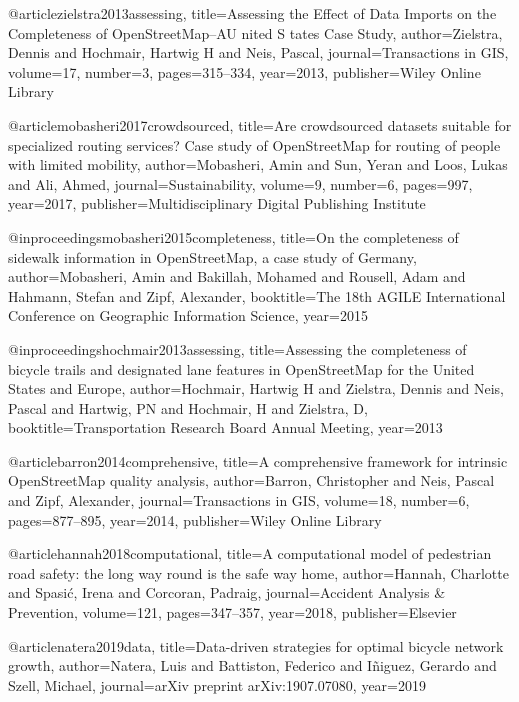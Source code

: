 @article{zielstra2013assessing,
  title={Assessing the Effect of Data Imports on the Completeness of OpenStreetMap--AU nited S tates Case Study},
  author={Zielstra, Dennis and Hochmair, Hartwig H and Neis, Pascal},
  journal={Transactions in GIS},
  volume={17},
  number={3},
  pages={315--334},
  year={2013},
  publisher={Wiley Online Library}
}


@article{mobasheri2017crowdsourced,
  title={Are crowdsourced datasets suitable for specialized routing services? Case study of OpenStreetMap for routing of people with limited mobility},
  author={Mobasheri, Amin and Sun, Yeran and Loos, Lukas and Ali, Ahmed},
  journal={Sustainability},
  volume={9},
  number={6},
  pages={997},
  year={2017},
  publisher={Multidisciplinary Digital Publishing Institute}
}

@inproceedings{mobasheri2015completeness,
  title={On the completeness of sidewalk information in OpenStreetMap, a case study of Germany},
  author={Mobasheri, Amin and Bakillah, Mohamed and Rousell, Adam and Hahmann, Stefan and Zipf, Alexander},
  booktitle={The 18th AGILE International Conference on Geographic Information Science},
  year={2015}
}

@inproceedings{hochmair2013assessing,
  title={Assessing the completeness of bicycle trails and designated lane features in OpenStreetMap for the United States and Europe},
  author={Hochmair, Hartwig H and Zielstra, Dennis and Neis, Pascal and Hartwig, PN and Hochmair, H and Zielstra, D},
  booktitle={Transportation Research Board Annual Meeting},
  year={2013}
}

@article{barron2014comprehensive,
  title={A comprehensive framework for intrinsic OpenStreetMap quality analysis},
  author={Barron, Christopher and Neis, Pascal and Zipf, Alexander},
  journal={Transactions in GIS},
  volume={18},
  number={6},
  pages={877--895},
  year={2014},
  publisher={Wiley Online Library}
}

@article{hannah2018computational,
  title={A computational model of pedestrian road safety: the long way round is the safe way home},
  author={Hannah, Charlotte and Spasi{\'c}, Irena and Corcoran, Padraig},
  journal={Accident Analysis \& Prevention},
  volume={121},
  pages={347--357},
  year={2018},
  publisher={Elsevier}
}

@article{natera2019data,
  title={Data-driven strategies for optimal bicycle network growth},
  author={Natera, Luis and Battiston, Federico and I{\~n}iguez, Gerardo and Szell, Michael},
  journal={arXiv preprint arXiv:1907.07080},
  year={2019}
}


